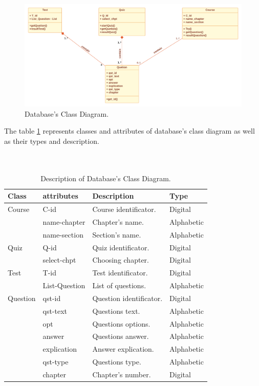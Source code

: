 \begin{figure}[ht]
	\centering
	\label{}\includegraphics[scale=0.45]{img/BDD class.pdf}                
	\caption{Database's Class Diagram.} 
	\label{fig:BDD DC}
\end{figure} 



The table \ref{tab:BDD DC} represents classes and attributes of database's class diagram as well as their types and description.\\\\\\
\newpage
\begin{table}[h!]
	\begin{center}
		\begin{tabular}{ |p{3cm}|p{3cm}|p{4cm}|p{2cm}|  }
 		\hline
 		Class & attributes & Description & Type \\
 		\hline \hline
 		Course & C-id & Course identificator. & Digital  \\
			& name-chapter & Chapter's name. & Alphabetic \\
			& name-section & Section's name. & Alphabetic \\
		\hline
		Quiz & Q-id & Quiz identificator. & Digital  \\
			& select-chpt & Choosing chapter. & Digital \\
		\hline
		Test & T-id & Test identificator. & Digital  \\
			& List-Question & List of questions. & Alphabetic \\
		\hline
		Question & qst-id & Question identificator. & Digital  \\
			& qst-text & Questions text. & Alphabetic \\
			& opt & Questions options. & Alphabetic \\
			& answer & Questions answer. & Alphabetic \\
			& explication & Answer explication. & Alphabetic \\

			& qst-type & Questions type. & Alphabetic \\
			& chapter & Chapter's number. & Digital \\
		\hline
\end{tabular}
\end{center}
\caption{Description of Database's Class Diagram.}
\label{tab:BDD DC}
\end{table}


